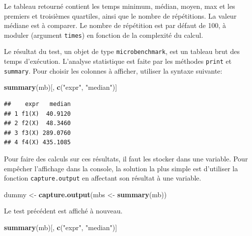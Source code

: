 \documentclass[
  12pt,
  french,
  a4paper,
  extrafontsizes,onecolumn,openright
  ]{memoir}
\newenvironment{Shaded}{\begin{snugshade}}{\end{snugshade}}
\newcommand{\KeywordTok}[1]{\textcolor[rgb]{0.13,0.29,0.53}{\textbf{#1}}}
\newcommand{\NormalTok}[1]{#1}
\newcommand{\StringTok}[1]{\textcolor[rgb]{0.31,0.60,0.02}{#1}}
\begin{document}
Le tableau retourné contient les temps minimum, médian, moyen, max et les premiers et troisièmes quartiles, ainsi que le nombre de répétitions.
La valeur médiane est à comparer.
Le nombre de répétition est par défaut de 100, à moduler (argument \texttt{times}) en fonction de la complexité du calcul.

Le résultat du test, un objet de type \texttt{microbenchmark}, est un tableau brut des temps d'exécution.
L'analyse statistique est faite par les méthodes \texttt{print} et \texttt{summary}.
Pour choisir les colonnes à afficher, utiliser la syntaxe suivante:

\scriptsize

\begin{Shaded}
\begin{Highlighting}[]
\KeywordTok{summary}\NormalTok{(mb)[, }\KeywordTok{c}\NormalTok{(}\StringTok{"expr"}\NormalTok{, }\StringTok{"median"}\NormalTok{)]}
\end{Highlighting}
\end{Shaded}

\begin{verbatim}
##    expr   median
## 1 f1(X)  40.9120
## 2 f2(X)  48.3460
## 3 f3(X) 289.0760
## 4 f4(X) 435.1085
\end{verbatim}

\normalsize

Pour faire des calculs sur ces résultats, il faut les stocker dans une variable.
Pour empêcher l'affichage dans la console, la solution la plus simple est d'utiliser la fonction \texttt{capture.output} en affectant son résultat à une variable.

\scriptsize

\begin{Shaded}
\begin{Highlighting}[]
\NormalTok{dummy <-}\StringTok{ }\KeywordTok{capture.output}\NormalTok{(mbs <-}\StringTok{ }\KeywordTok{summary}\NormalTok{(mb))}
\end{Highlighting}
\end{Shaded}

\normalsize

Le test précédent est affiché à nouveau.

\scriptsize

\begin{Shaded}
\begin{Highlighting}[]
\KeywordTok{summary}\NormalTok{(mb)[, }\KeywordTok{c}\NormalTok{(}\StringTok{"expr"}\NormalTok{, }\StringTok{"median"}\NormalTok{)]}
\end{Highlighting}
\end{Shaded}
\end{document}
